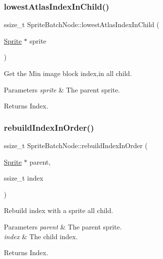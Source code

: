 \subsubsection{\texorpdfstring{lowest\+Atlas\+Index\+In\+Child()}{lowestAtlasIndexInChild()}\hspace{0.1cm}{\footnotesize\ttfamily [2/2]}}
{\footnotesize\ttfamily ssize\+\_\+t Sprite\+Batch\+Node\+::lowest\+Atlas\+Index\+In\+Child (\begin{DoxyParamCaption}\item[{\hyperlink{classSprite}{Sprite} $\ast$}]{sprite }\end{DoxyParamCaption})}

Get the Min image block index,in all child.


\begin{DoxyParams}{Parameters}
{\em sprite} & The parent sprite. \\
\hline
\end{DoxyParams}
\begin{DoxyReturn}{Returns}
Index. 
\end{DoxyReturn}
\mbox{\label{classSpriteBatchNode_a7de1df383d81f839fb932ad571273766}} 
\subsubsection{\texorpdfstring{rebuild\+Index\+In\+Order()}{rebuildIndexInOrder()}\hspace{0.1cm}{\footnotesize\ttfamily [1/2]}}
{\footnotesize\ttfamily ssize\+\_\+t Sprite\+Batch\+Node\+::rebuild\+Index\+In\+Order (\begin{DoxyParamCaption}\item[{\hyperlink{classSprite}{Sprite} $\ast$}]{parent,  }\item[{ssize\+\_\+t}]{index }\end{DoxyParamCaption})}

Rebuild index with a sprite all child.


\begin{DoxyParams}{Parameters}
{\em parent} & The parent sprite. \\
\hline
{\em index} & The child index. \\
\hline
\end{DoxyParams}
\begin{DoxyReturn}{Returns}
Index. 
\end{DoxyReturn}
\mbox{\label{classSpriteBatchNode_a7de1df383d81f839fb932ad571273766}} 
